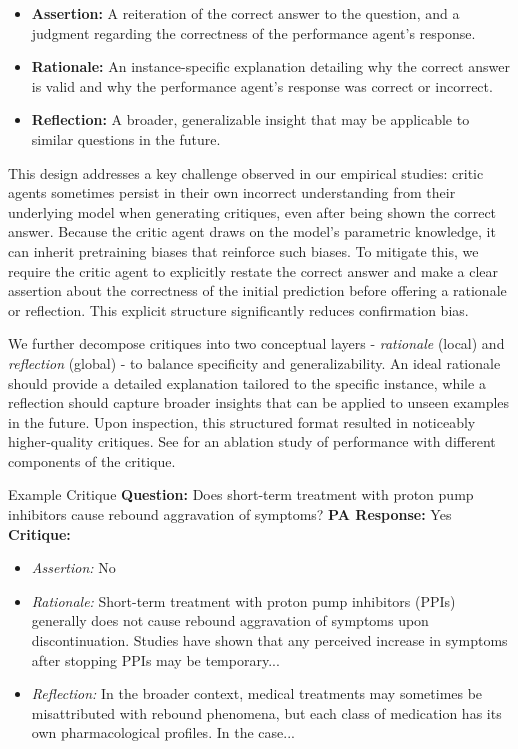 \begin{itemize}[leftmargin=1.5em,topsep=0.8em]
    \item \textbf{Assertion:} A reiteration of the correct answer to the question, and a judgment regarding the correctness of the performance agent’s response.
    \item \textbf{Rationale:} An instance-specific explanation detailing why the correct answer is valid and why the performance agent’s response was correct or incorrect.
    \item \textbf{Reflection:} A broader, generalizable insight that may be applicable to similar questions in the future.
\end{itemize}

This design addresses a key challenge observed in our empirical studies: critic agents sometimes persist in their own incorrect understanding from their underlying model when generating critiques, even after being shown the correct answer. Because the critic agent draws on the model’s parametric knowledge, it can inherit pretraining biases that reinforce such biases. To mitigate this, we require the critic agent to explicitly restate the correct answer and make a clear assertion about the correctness of the initial prediction before offering a rationale or reflection. This explicit structure significantly reduces confirmation bias.

We further decompose critiques into two conceptual layers - \textit{rationale} (local) and \textit{reflection} (global) - to balance specificity and generalizability. An ideal rationale should provide a detailed explanation tailored to the specific instance, while a reflection should capture broader insights that can be applied to unseen examples in the future. Upon inspection, this structured format resulted in noticeably higher-quality critiques. See  for an ablation study of performance with different components of the critique.

\begin{promptbox}{Example Critique}
\textbf{Question:} Does short-term treatment with proton pump inhibitors cause rebound aggravation of symptoms? \newline
\textbf{PA Response:} Yes \newline
\textbf{Critique:}
\begin{itemize}[leftmargin=.5em,topsep=0.3em]
\setlength{\itemsep}{-0.3em}
\item \textit{Assertion:} No
  \item \textit{Rationale:} Short-term treatment with proton pump inhibitors (PPIs) generally does not cause rebound aggravation of symptoms upon discontinuation. Studies have shown that any perceived increase in symptoms after stopping PPIs may be temporary...
  \item \textit{Reflection:} In the broader context, medical treatments may sometimes be misattributed with rebound phenomena, but each class of medication has its own pharmacological profiles.  In the case...
\end{itemize}
\end{promptbox}

